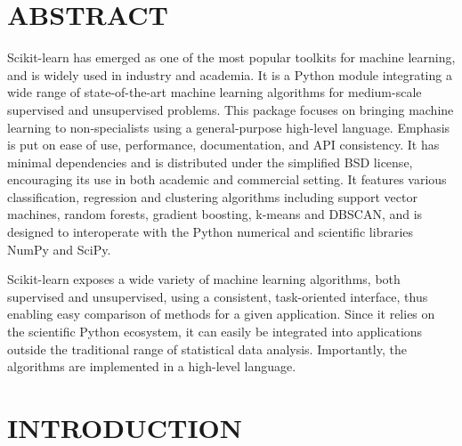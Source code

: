 \documentclass[12pt]{article}
\begin{document}
\section{ABSTRACT}
Scikit-learn has emerged as one of the most popular toolkits for machine learning, and is widely used in industry and academia. It is a Python module integrating a wide range of state-of-the-art machine learning algorithms for medium-scale supervised and unsupervised problems. This package
focuses on bringing machine learning to non-specialists using a general-purpose high-level
language. Emphasis is put on ease of use, performance, documentation, and API consistency. It has minimal dependencies and is distributed under the simpliﬁed BSD license,
encouraging its use in both academic and commercial setting. It features various classification, regression and clustering algorithms including support vector machines, random forests, gradient boosting, k-means and DBSCAN, and is designed to interoperate with the Python numerical and scientific libraries NumPy and SciPy.

Scikit-learn exposes a wide variety of machine learning algorithms, both supervised and unsupervised, using a consistent, task-oriented interface, thus enabling easy comparison of methods for a
given application. Since it relies on the scientiﬁc Python ecosystem, it can easily be integrated into
applications outside the traditional range of statistical data analysis. Importantly, the algorithms are
implemented in a high-level language.



\newpage
\section{INTRODUCTION}
    
\end{document}
